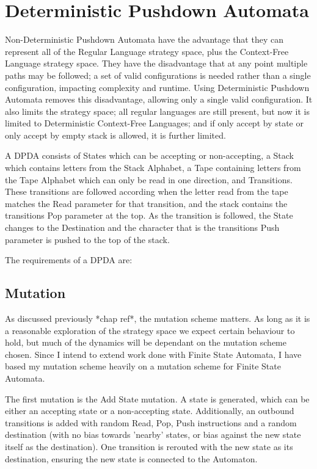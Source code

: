 \documentclass[a4paper,11pt,bcshonoursthesis,singlespace,twoside]{cssethesis}
\begin{document}
\section{Deterministic Pushdown Automata}
Non-Deterministic Pushdown Automata have the advantage that they can represent all of the Regular Language strategy space, plus the Context-Free Language strategy space. They have the disadvantage that at any point multiple paths may be followed; a set of valid configurations is needed rather than a single configuration, impacting complexity and runtime. Using Deterministic Pushdown Automata removes this disadvantage, allowing only a single valid configuration. 
It also limits the strategy space; all regular languages are still present, but now it is limited to Deterministic Context-Free Languages; and if only accept by state or only accept by empty stack is allowed, it is further limited. 

A DPDA consists of States which can be accepting or non-accepting, a Stack which contains letters from the Stack Alphabet, a Tape containing letters from the Tape Alphabet which can only be read in one direction, and Transitions. These transitions are followed according when the letter read from the tape matches the Read parameter for that transition, and the stack contains the transitions Pop parameter at the top. As the transition is followed, the State changes to the Destination and the character that is the transitions Push parameter is pushed to the top of the stack. 

The requirements of a DPDA are:



\subsection{Mutation}
As discussed previously *chap ref*, the mutation scheme matters. As long as it is a reasonable exploration of the strategy space we expect certain behaviour to hold, but much of the dynamics will be dependant on the mutation scheme chosen. Since I intend to extend work done with Finite State Automata, I have based my mutation scheme heavily on a mutation scheme for Finite State Automata.

The first mutation is the Add State mutation. A state is generated, which can be either an accepting state or a non-accepting state. Additionally, an outbound transitions is added with random Read, Pop, Push instructions and a random destination (with no bias towards 'nearby' states, or bias against the new state itself as the destination). One transition is rerouted with the new state as its destination, ensuring the new state is connected to the Automaton. 
\end{document}
